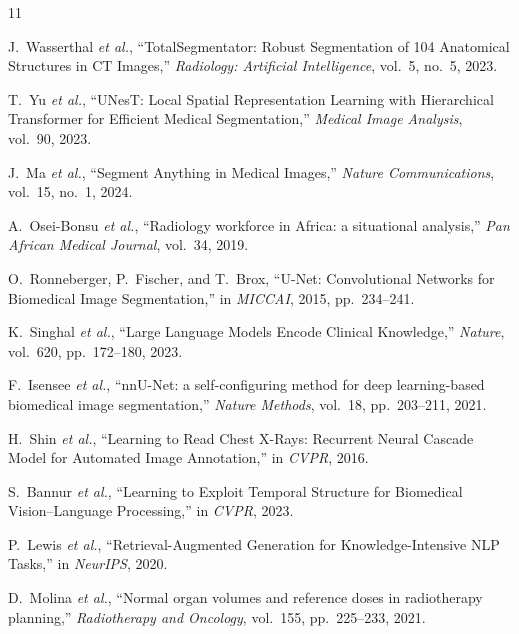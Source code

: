 \documentclass[conference]{IEEEtran}
\begin{document}

\begin{thebibliography}{11}

J.~Wasserthal \textit{et al.}, ``TotalSegmentator: Robust Segmentation of 104
Anatomical Structures in CT Images,'' \textit{Radiology: Artificial Intelligence},
vol.~5, no.~5, 2023.

T.~Yu \textit{et al.}, ``UNesT: Local Spatial Representation Learning with
Hierarchical Transformer for Efficient Medical Segmentation,''
\textit{Medical Image Analysis}, vol.~90, 2023.

J.~Ma \textit{et al.}, ``Segment Anything in Medical Images,''
\textit{Nature Communications}, vol.~15, no.~1, 2024.

A.~Osei-Bonsu \textit{et al.}, ``Radiology workforce in Africa: a situational
analysis,'' \textit{Pan African Medical Journal}, vol.~34, 2019.

O.~Ronneberger, P.~Fischer, and T.~Brox, ``U-Net: Convolutional Networks for
Biomedical Image Segmentation,'' in \textit{MICCAI}, 2015, pp.~234--241.

K.~Singhal \textit{et al.}, ``Large Language Models Encode Clinical Knowledge,''
\textit{Nature}, vol.~620, pp.~172--180, 2023.

F.~Isensee \textit{et al.}, ``nnU-Net: a self-configuring method for deep
learning-based biomedical image segmentation,'' \textit{Nature Methods},
vol.~18, pp.~203--211, 2021.

H.~Shin \textit{et al.}, ``Learning to Read Chest X-Rays: Recurrent Neural
Cascade Model for Automated Image Annotation,'' in \textit{CVPR}, 2016.

S.~Bannur \textit{et al.}, ``Learning to Exploit Temporal Structure for
Biomedical Vision--Language Processing,'' in \textit{CVPR}, 2023.

P.~Lewis \textit{et al.}, ``Retrieval-Augmented Generation for
Knowledge-Intensive NLP Tasks,'' in \textit{NeurIPS}, 2020.

D.~Molina \textit{et al.}, ``Normal organ volumes and reference doses in
radiotherapy planning,'' \textit{Radiotherapy and Oncology}, vol.~155,
pp.~225--233, 2021.

\end{thebibliography}
\end{document}
